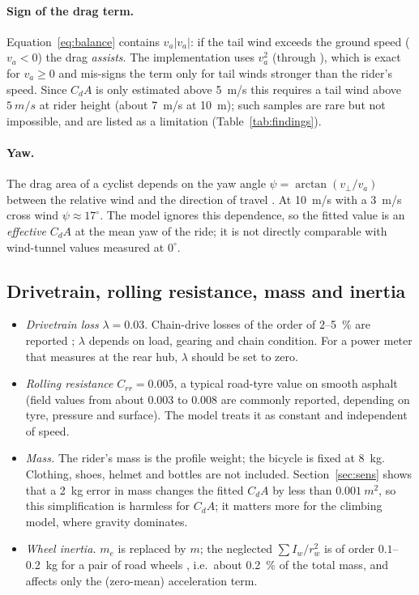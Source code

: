 \documentclass[11pt,a4paper]{article}
\newcommand{\code}[1]{\texttt{\detokenize{#1}}}
\newcommand{\CdA}{C_{\!d}A}
\begin{document}
\paragraph{Sign of the drag term.} Equation~\eqref{eq:balance} contains \(v_a\lvert v_a\rvert\): if the tail wind exceeds the ground speed (\(v_a<0\)) the drag \emph{assists}. The implementation uses \(v_a^2\) (through \code{abs}), which is exact for \(v_a\ge0\) and mis-signs the term only for tail winds stronger than the rider's speed. Since \(\CdA\) is only estimated above \SI{5}{m/s} this requires a tail wind above \(\SI{5}{m/s}\) at rider height (about \SI{7}{m/s} at \SI{10}{m}); such samples are rare but not impossible, and are listed as a limitation (Table~\ref{tab:findings}).

\paragraph{Yaw.} The drag area of a cyclist depends on the yaw angle \(\psi=\arctan(v_\perp/v_a)\) between the relative wind and the direction of travel \citep{crouch2017}. At \SI{10}{m/s} with a \SI{3}{m/s} cross wind \(\psi\approx17^\circ\). The model ignores this dependence, so the fitted value is an \emph{effective} \(\CdA\) at the mean yaw of the ride; it is not directly comparable with wind-tunnel values measured at \(0^\circ\).

\subsection{Drivetrain, rolling resistance, mass and inertia}
\begin{itemize}
 \item \emph{Drivetrain loss} \(\lambda=0.03\). Chain-drive losses of the order of \(2\)--\SI{5}{\percent} are reported \citep{martin1998,spicer2001}; \(\lambda\) depends on load, gearing and chain condition. For a power meter that measures at the rear hub, \(\lambda\) should be set to zero.
 \item \emph{Rolling resistance} \(C_{rr}=0.005\), a typical road-tyre value on smooth asphalt (field values from about \(0.003\) to \(0.008\) are commonly reported, depending on tyre, pressure and surface). The model treats it as constant and independent of speed.
 \item \emph{Mass.} The rider's mass is the profile weight; the bicycle is fixed at \SI{8}{kg}. Clothing, shoes, helmet and bottles are not included. Section~\ref{sec:sens} shows that a \SI{2}{kg} error in mass changes the fitted \(\CdA\) by less than \(0.001\ \si{m^2}\), so this simplification is harmless for \(\CdA\); it matters more for the climbing model, where gravity dominates.
 \item \emph{Wheel inertia.} \(m_e\) is replaced by \(m\); the neglected \(\sum I_w/r_w^2\) is of order \(0.1\)--\SI{0.2}{kg} for a pair of road wheels \citep{martin1998}, i.e.\ about \SI{0.2}{\percent} of the total mass, and affects only the (zero-mean) acceleration term.
\end{itemize}
\end{document}

